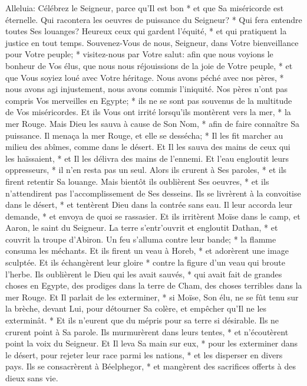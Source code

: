 Alleluia: Célébrez le Seigneur, parce qu'Il est bon * et que Sa miséricorde est éternelle.
Qui racontera les oeuvres de puissance du Seigneur? * Qui fera entendre toutes Ses louanges?
Heureux ceux qui gardent l'équité, * et qui pratiquent la justice en tout temps.
Souvenez-Vous de nous, Seigneur, dans Votre bienveillance pour Votre peuple; * visitez-nous par Votre salut:
afin que nous voyions le bonheur de Vos élus, que nous nous réjouissions de la joie de Votre peuple, * et que Vous soyiez loué avec Votre héritage.
Nous avons péché avec nos pères, * nous avons agi injustement, nous avons commis l'iniquité.
Nos pères n'ont pas compris Vos merveilles en Egypte; * ils ne se sont pas souvenus de la multitude de Vos miséricordes. Et ils Vous ont irrité lorsqu'ils montèrent vers la mer, * la mer Rouge.
Mais Dieu les sauva à cause de Son Nom, * afin de faire connaître Sa puissance.
Il menaça la mer Rouge, et elle se dessécha; * Il les fit marcher au milieu des abîmes, comme dans le désert.
Et Il les sauva des mains de ceux qui les haïssaient, * et Il les délivra des mains de l'ennemi.
Et l'eau engloutit leurs oppresseurs, * il n'en resta pas un seul.
Alors ils crurent à Ses paroles, * et ils firent retentir Sa louange.
Mais bientôt ils oublièrent Ses oeuvres, * et ils n'attendirent pas l'accomplissement de Ses desseins.
Ils se livrèrent à la convoitise dans le désert, * et tentèrent Dieu dans la contrée sans eau.
Il leur accorda leur demande, * et envoya de quoi se rassasier.
Et ils irritèrent Moïse dans le camp, et Aaron, le saint du Seigneur.
La terre s'entr'ouvrit et engloutit Dathan, * et couvrit la troupe d'Abiron.
Un feu s'alluma contre leur bande; * la flamme consuma les méchants.
Et ils firent un veau à Horeb, * et adorèrent une image sculptée.
Et ils échangèrent leur gloire * contre la figure d'un veau qui broute l'herbe.
Ils oublièrent le Dieu qui les avait sauvés, * qui avait fait de grandes choses en Egypte,
des prodiges dans la terre de Cham, des choses terribles dans la mer Rouge.
Et Il parlait de les exterminer, * si Moïse, Son élu, ne se fût tenu sur la brèche, devant Lui, pour détourner Sa colère, et empêcher qu'Il ne les exterminât. *
Et ils n'eurent que du mépris pour sa terre si désirable. Ils ne crurent point à Sa parole.
Ils murmurèrent dans leurs tentes, * et n'écoutèrent point la voix du Seigneur.
Et Il leva Sa main sur eux, * pour les exterminer dans le désert,
pour rejeter leur race parmi les nations, * et les disperser en divers pays.
Ils se consacrèrent à Béelphegor, * et mangèrent des sacrifices offerts à des dieux sans vie.
